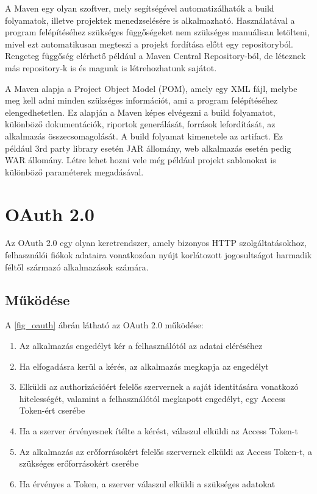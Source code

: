 A Maven egy olyan szoftver, mely segítségével automatizálhatók a build folyamatok, illetve projektek menedzselésére is alkalmazható.\cite{maven1}\cite{maven2}
Használatával a program felépítéséhez szükséges függőségeket nem szükséges manuálisan letölteni, mivel ezt automatikusan megteszi a projekt fordítása előtt egy repositoryból.
Rengeteg függőség elérhető például a Maven Central Repository-ból, de léteznek más repository-k is és magunk is létrehozhatunk sajátot. 

A Maven alapja a Project Object Model (POM), amely egy XML fájl, melybe meg kell adni minden szükséges információt, ami a program felépítéséhez elengedhetetlen.
Ez alapján a Maven képes elvégezni a build folyamatot, különböző dokumentációk, riportok generálását, források lefordítását, az alkalmazás összecsomagolását.
A build folyamat kimenetele az artifact.
Ez például 3rd party library esetén JAR állomány, web alkalmazás esetén pedig WAR állomány.
Létre lehet hozni vele még például projekt sablonokat is különböző paraméterek megadásával. 


\section{OAuth 2.0}

Az OAuth 2.0 egy olyan keretrendszer, amely bizonyos HTTP szolgáltatásokhoz, felhasználói fiókok adataira vonatkozóan nyújt korlátozott jogosultságot harmadik féltől származó alkalmazások számára.\cite{oauth}

\subsection*{Működése} 

A \ref{fig_oauth} ábrán látható az OAuth 2.0 működése: 



\begin{enumerate}
\item Az alkalmazás engedélyt kér a felhasználótól az adatai eléréséhez 
\item Ha elfogadásra kerül a kérés, az alkalmazás megkapja az engedélyt 
\item Elküldi az authorizációért felelős szervernek a saját identitására vonatkozó hitelességét, valamint a felhasználótól megkapott engedélyt, egy Access Token-ért cserébe 
\item Ha a szerver érvényesnek ítélte a kérést, válaszul elküldi az Access Token-t 
\item Az alkalmazás az erőforrásokért felelős szervernek elküldi az Access Token-t, a szükséges erőforrásokért cserébe 
\item Ha érvényes a Token, a szerver válaszul elküldi a szükséges adatokat 
\end{enumerate}



